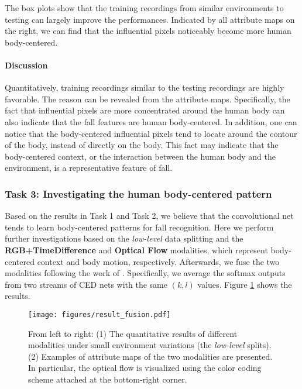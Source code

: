 \documentclass[runningheads]{llncs}
\begin{document}
The box plots show that the training recordings from similar environments to testing can largely improve the performances. Indicated by all attribute maps on the right, we can find that the influential pixels noticeably become more human body-centered. 

\paragraph{Discussion} Quantitatively, training recordings similar to the testing recordings are highly favorable. The reason can be revealed from the attribute maps. Specifically, the fact that influential pixels are more concentrated around the human body can also indicate that the fall features are human body-centered. In addition, one can notice that the body-centered influential pixels tend to locate around the contour of the body, instead of directly on the body. This fact may indicate that the body-centered context, or the interaction between the human body and the environment, is a representative feature of fall. 





\subsubsection{Task 3: Investigating the human body-centered pattern}

Based on the results in Task 1 and Task 2, we believe that the convolutional net tends to learn body-centered patterns for fall recognition. Here we perform further investigations based on the {\em low-level} data splitting and the {\bf RGB+TimeDifference} and {\bf Optical Flow} modalities, which represent body-centered context and body motion, respectively. Afterwards, we fuse the two modalities following the work of \cite{simonyan2014two}. Specifically, we average the softmax outputs from two streams of CED nets with the same $(k,l)$ values. Figure \ref{fig:fusion} shows the results.


\begin{figure}
\centering
\texttt{[image: figures/result\_fusion.pdf]}
\caption{From left to right: (1) The quantitative results of different modalities under small environment variations (the {\em low-level} splits). (2) Examples of attribute maps of the two modalities are presented. In particular, the optical flow is visualized using the color coding scheme attached at the bottom-right corner. }
\label{fig:fusion}
\end{figure}
\end{document}
